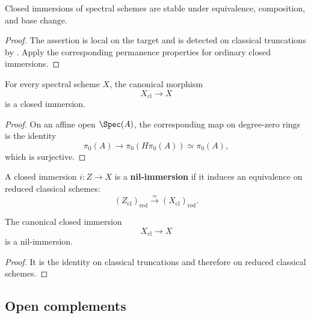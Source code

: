 \begin{proposition}
\label{prop:closed-immersion-permanence}
Closed immersions of spectral schemes are stable under equivalence,
composition, and base change.
\end{proposition}

\begin{proof}
The assertion is local on the target and is detected on classical
truncations by
. Apply the corresponding
permanence properties for ordinary closed immersions.
\end{proof}

\begin{proposition}
\label{prop:classical-truncation-closed-immersion}
For every spectral scheme $X$, the canonical morphism
\[
    X_{\mathrm{cl}}
    \longrightarrow
    X
\]
is a closed immersion.
\end{proposition}

\begin{proof}
On an affine open $\Spec(A)$, the corresponding map on degree-zero rings
is the identity
\[
    \pi_0(A)
    \longrightarrow
    \pi_0(H\pi_0(A))
    \simeq
    \pi_0(A),
\]
which is surjective.
\end{proof}

\begin{definition}
\label{def:nil-immersion-spectral}
A closed immersion $i:Z\to X$ is a \textbf{nil-immersion} if it induces an
equivalence on reduced classical schemes:
\[
    (Z_{\mathrm{cl}})_{\mathrm{red}}
    \xrightarrow{\simeq}
    (X_{\mathrm{cl}})_{\mathrm{red}}.
\]
\end{definition}

\begin{corollary}
\label{cor:classical-truncation-nil-immersion}
The canonical closed immersion
\[
    X_{\mathrm{cl}}
    \longrightarrow
    X
\]
is a nil-immersion.
\end{corollary}

\begin{proof}
It is the identity on classical truncations and therefore on reduced
classical schemes.
\end{proof}

\subsection{Open complements}

